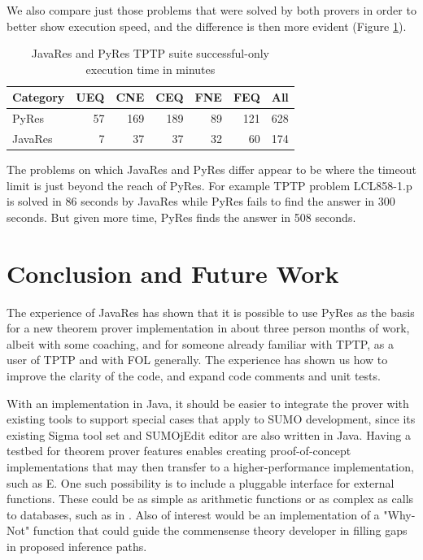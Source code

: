 \documentclass{llncs}
\begin{document}
We also compare just those problems that were solved by both provers in order to better show execution speed,
and the difference is then more evident (Figure \ref{tab:res3}).

\begin{table}[tbh]
  \begin{tabular}{lrrrrrr}
    \hline
    \textbf{Category} & \textbf{UEQ} & \textbf{CNE} & \textbf{CEQ} & \textbf{FNE} & \textbf{FEQ} & \textbf{All}\\
    \hline   %
    PyRes     &   57 &  169 &   189 &   89 &   121 &  628 \\
    JavaRes   &    7 &   37 &    37 &   32 &    60 &  174 \\
    \hline
  \end{tabular}
  \caption{JavaRes and PyRes TPTP suite successful-only execution time in minutes}
  \label{tab:res3}
\end{table}

The problems on which JavaRes and PyRes differ appear to be where the timeout limit is just beyond
the reach of PyRes.  For example TPTP problem LCL858-1.p is solved in 86 seconds by JavaRes while
PyRes fails to find the answer in 300 seconds.  But given more time, PyRes finds the answer in 508 seconds.


\section{Conclusion and Future Work}

The experience of JavaRes has shown that it is possible to use PyRes
as the basis for a new theorem prover implementation in about three
person months of work, albeit with some coaching, and for someone
already familiar with TPTP, as a user of TPTP and with FOL generally.
The experience has shown us how to improve the clarity of the code,
and expand code comments and unit tests.

With an implementation in Java, it should be easier to integrate the
prover with existing tools to support special cases that apply to SUMO
development, since its existing Sigma tool set \cite{pease2013sigma}
and SUMOjEdit editor \cite{pease2020programmer} are also written in
Java.  Having a testbed for theorem prover features enables creating
proof-of-concept implementations that may then transfer to a
higher-performance implementation, such as E.  One such possibility is
to include a pluggable interface for external functions.  These could
be as simple as arithmetic functions or as complex as calls to
databases, such as in \cite{DBLP:conf/ki/SudaSWLM09}.  Also of
interest would be an implementation of a "Why-Not" function
\cite{10.5555/1650083.1650093} that could guide the commensense theory
developer in filling gaps in proposed inference paths.
\end{document}
